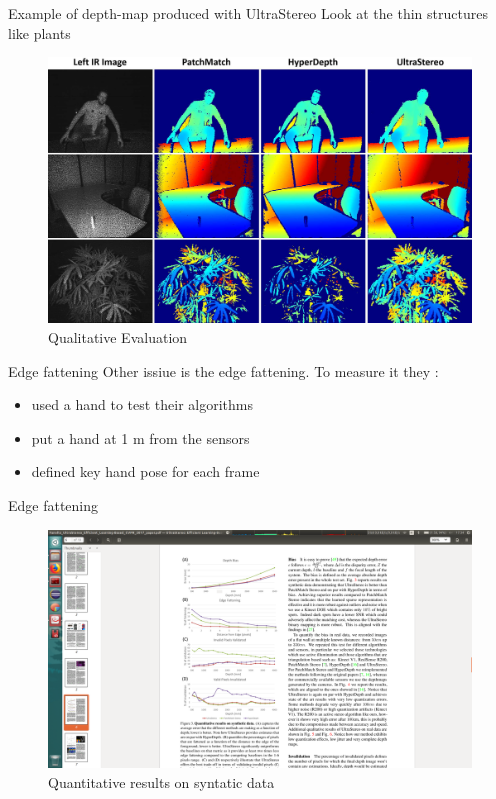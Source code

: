 \begin{frame}{Example of depth-map produced with UltraStereo}
Look at the thin structures like plants
\begin{figure}
\includegraphics[scale=0.08]{pictures/fig5}
\caption{Qualitative Evaluation}
\end{figure}
\end{frame}

\begin{frame}{Edge fattening}
Other issiue is the edge fattening. To measure it they :
\begin{itemize}
\item used a hand to test their algorithms
\item put a hand at 1 m from the sensors
\item defined key hand pose for each frame
\end{itemize}
\end{frame}

\begin{frame}{Edge fattening}

\begin{figure}
\includegraphics[scale=0.06]{pictures/fig3}
\caption{Quantitative results on syntatic data}
\end{figure}
\end{frame}

